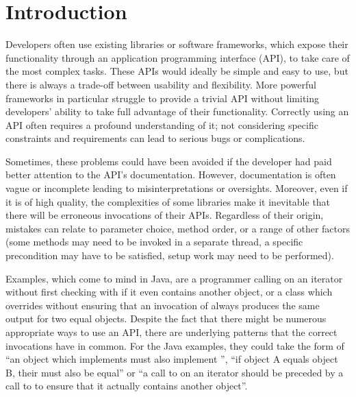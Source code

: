 \chapter{Introduction}\label{ch:intro}

Developers often use existing libraries or software frameworks, which expose their functionality through an application programming interface (API), to take care of the most complex tasks.
These APIs would ideally be simple and easy to use, but there is always a trade-off between usability and flexibility.
More powerful frameworks in particular struggle to provide a trivial API without limiting developers' ability to take full advantage of their functionality.
Correctly using an API often requires a profound understanding of it;
not considering specific constraints and requirements can lead to serious bugs or complications.

Sometimes, these problems could have been avoided if the developer had paid better attention to the API's documentation.
However, documentation is often vague or incomplete leading to misinterpretations or oversights.
Moreover, even if it is of high quality, the complexities of some libraries make it inevitable that there will be erroneous invocations of their APIs.
Regardless of their origin, mistakes can relate to parameter choice, method order, or a range of other factors (some methods may need to be invoked in a separate thread, a specific precondition may have to be satisfied, setup work may need to be performed).

Examples, which come to mind in Java, are a programmer calling  on an iterator without first checking with  if it even contains another object, or a class which overrides  without ensuring that an invocation of  always produces the same output for two equal objects.
Despite the fact that there might be numerous appropriate ways to use an API, there are underlying patterns that the correct invocations have in common.
For the Java examples, they could take the form of ``an object which implements  must also implement '', ``if object A equals object B, their  must also be equal'' or ``a call to  on an iterator should be preceded by a call to  to ensure that it actually contains another object''.

